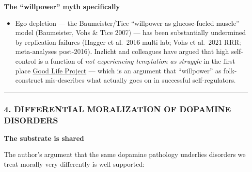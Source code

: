\textbf{The ``willpower'' myth specifically}

\begin{itemize}
\tightlist
\item
  Ego depletion --- the Baumeister/Tice ``willpower as glucose-fueled muscle'' model (Baumeister, Vohs \& Tice 2007) --- has been substantially undermined by replication failures (Hagger et al.~2016 multi-lab; Vohs et al.~2021 RRR; meta-analyses post-2016). Inzlicht and colleagues have argued that high self-control is a function of \emph{not experiencing temptation as struggle} in the first place \href{https://www.goodlifeproject.com/podcast/the-surprising-truth-about-willpower-why-self-control-may-not-be-what-you-think-michael-inzlicht-phd/}{Good Life Project} --- which is an argument that ``willpower'' as folk-construct mis-describes what actually goes on in successful self-regulators.
\end{itemize}

\begin{center}\rule{0.5\linewidth}{0.5pt}\end{center}

\subsubsection{4. DIFFERENTIAL MORALIZATION OF DOPAMINE DISORDERS}\label{07_pleasure_and_self-differential-moralization-of-dopamine-disorders}

\textbf{The substrate is shared}

The author's argument that the same dopamine pathology underlies disorders we treat morally very differently is well supported:


